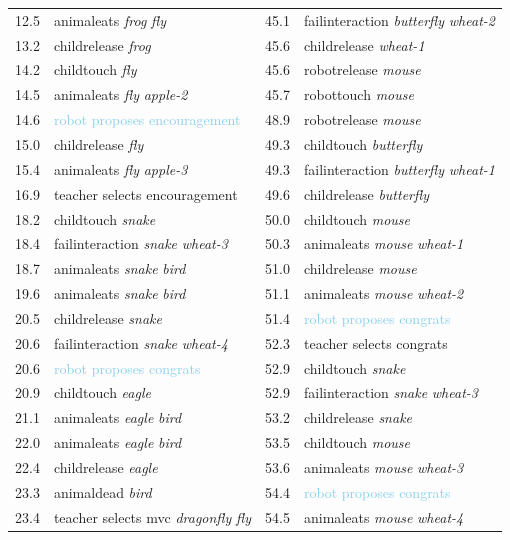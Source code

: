 {\begin{table}[ht]
\begin{tabularx}{\textwidth}{@{}L{.2}L{1.7}|L{.2}L{1.9}@{}}
12.5 & animaleats \emph{frog} \emph{fly} & 45.1 & failinteraction \emph{butterfly} \emph{wheat-2}\\
13.2 & childrelease \emph{frog} & 45.6 & childrelease \emph{wheat-1}\\
14.2 & childtouch \emph{fly} & 45.6 & robotrelease \emph{mouse}\\
14.5 & animaleats \emph{fly} \emph{apple-2} & 45.7 & robottouch \emph{mouse}\\
14.6 & \textcolor{SkyBlue}{robot proposes encouragement} & 48.9 & robotrelease \emph{mouse}\\
15.0 & childrelease \emph{fly} & 49.3 & childtouch \emph{butterfly}\\
15.4 & animaleats \emph{fly} \emph{apple-3} & 49.3 & failinteraction \emph{butterfly} \emph{wheat-1}\\
16.9 & \textcolor{BurntOrange}{teacher selects encouragement} & 49.6 & childrelease \emph{butterfly}\\
18.2 & childtouch \emph{snake} & 50.0 & childtouch \emph{mouse}\\
18.4 & failinteraction \emph{snake} \emph{wheat-3} & 50.3 & animaleats \emph{mouse} \emph{wheat-1}\\
18.7 & animaleats \emph{snake} \emph{bird} & 51.0 & childrelease \emph{mouse}\\
19.6 & animaleats \emph{snake} \emph{bird} & 51.1 & animaleats \emph{mouse} \emph{wheat-2}\\
20.5 & childrelease \emph{snake} & 51.4 & \textcolor{SkyBlue}{robot proposes congrats}\\
20.6 & failinteraction \emph{snake} \emph{wheat-4} & 52.3 & \textcolor{BurntOrange}{teacher selects congrats}\\
20.6 & \textcolor{SkyBlue}{robot proposes congrats} & 52.9 & childtouch \emph{snake}\\
20.9 & childtouch \emph{eagle} & 52.9 & failinteraction \emph{snake} \emph{wheat-3}\\
21.1 & animaleats \emph{eagle} \emph{bird} & 53.2 & childrelease \emph{snake}\\
22.0 & animaleats \emph{eagle} \emph{bird} & 53.5 & childtouch \emph{mouse}\\
22.4 & childrelease \emph{eagle} & 53.6 & animaleats \emph{mouse} \emph{wheat-3}\\
23.3 & animaldead \emph{bird} & 54.4 & \textcolor{SkyBlue}{robot proposes congrats}\\
23.4 & \textcolor{BurntOrange}{teacher selects mvc \emph{dragonfly} \emph{fly}} & 54.5 & animaleats \emph{mouse} \emph{wheat-4}\\

\end{tabularx}
\end{table}}
